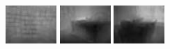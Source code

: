 \begin{figure}[htb]
\begin{subfigure}{0.24\linewidth}
\begin{minipage}[b]{1\linewidth}
  \includegraphics[width=1\linewidth]{figure/Pixel_cla_nyu/3eigen.jpg}\vspace{3.5pt}
  \includegraphics[width=1\linewidth]{figure/Pixel_cla_nyu/4eigen.jpg}\vspace{3.5pt}
  \includegraphics[width=1\linewidth]{figure/Pixel_cla_nyu/5eigen.jpg}

\end{minipage}
\end{subfigure}
\end{figure}
